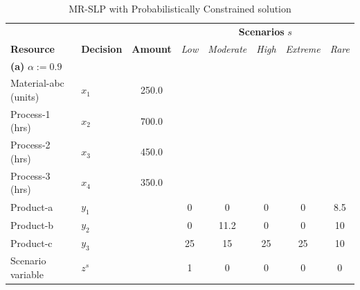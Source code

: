 \documentclass[7pt]{article}
\begin{document}
\begin{table}[h!]
    \centering
    \footnotesize
    \caption{\small{MR-SLP with Probabilistically Constrained solution}}
    \begin{tabular}{ll|c|ccccc}
        \toprule
        \multicolumn{3}{l|}{} & \multicolumn{5}{c}{\textbf{Scenarios }$s$}                                                                                                         \\
        \textbf{Resource}     & \textbf{Decision}                          & \textbf{Amount} & \textit{Low} & \textit{Moderate} & \textit{High} & \textit{Extreme} & \textit{Rare} \\
        \midrule
        \multicolumn{8}{l}{\textbf{(a)} $\alpha := 0.9$}                                                                                                                           \\
        \midrule
        Material-abc (units)  & $x_1$                                      & 250.0           &              &                   &               &                                  \\
        Process-1 (hrs)       & $x_2$                                      & 700.0           &              &                   &               &                                  \\
        Process-2 (hrs)       & $x_3$                                      & 450.0           &              &                   &               &                                  \\
        Process-3 (hrs)       & $x_4$                                      & 350.0           &              &                   &               &                                  \\
        Product-a             & $y_1$                                      &                 & 0            & 0                 & 0             & 0                & 8.5           \\
        Product-b             & $y_2$                                      &                 & 0            & 11.2              & 0             & 0                & 10            \\
        Product-c             & $y_3$                                      &                 & 25           & 15                & 25            & 25               & 10            \\
        Scenario variable     & $z^s$                                      &                 & 1            & 0                 & 0             & 0                & 0             \\

\end{tabular}
\end{table}
\end{document}
